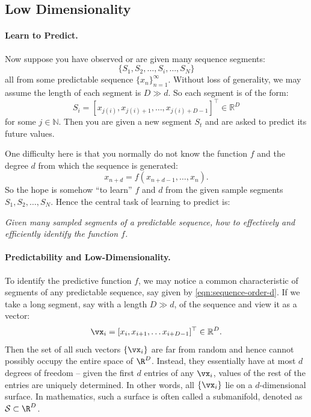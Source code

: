 \documentclass[../../book-main.tex]{subfiles}
\begin{document}
\subsection{Low Dimensionality}\label{sec:intro-low-dimensionality}
\paragraph{Learn to Predict.}
Now suppose you have observed or are given many sequence segments:
\begin{equation}
    \{S_1, S_2, \ldots, S_i, \ldots, S_N\}
\end{equation}
all from some predictable sequence $\{x_n\}_{n=1}^\infty$. Without loss of generality, we may assume the length of each segment is $D \gg d$. So each segment is of the form:
\begin{equation}
    S_i = [x_{j(i)}, x_{j(i)+1}, \ldots, x_{j(i)+D-1}]^\top \in \mathbb{R}^D
\end{equation}
for some $j \in \mathbb{N}$. Then you are given a new segment $S_t$ and are asked to predict its future values. 

One difficulty here is that you normally do not know the function $f$ and the degree $d$ from which the sequence is generated: 
\begin{equation}
    x_{n+d} = f(x_{n+d-1}, \ldots,  x_{n}).
\label{eqn:sequence-order-d}
\end{equation}
So the hope is somehow ``to learn'' $f$ and $d$ from the given sample segments $S_1, S_2, \ldots, S_N$. Hence the central task of learning to predict is:
\begin{center}
{\em Given many sampled segments of a predictable sequence, how to effectively and efficiently identify the function $f$.}
\end{center}

\paragraph{Predictability and Low-Dimensionality.}
To identify the predictive function $f$, we may notice a common characteristic of segments of any predictable sequence, say given by \eqref{eqn:sequence-order-d}. If we take a long segment, say with a length $D \gg d$, of the sequence and view it as a vector: 
\begin{equation}
    \vx_i = [x_i, x_{i+1}, \ldots x_{i+D-1}]^\top \in \mathbb{R}^D.
\end{equation}
Then the set of all such vectors $\{\vx_i\}$ are far from random and hence cannot possibly occupy the entire space of $\R^D$. Instead, they essentially have at most $d$ degrees of freedom -- given the first $d$ entries of any $\vx_i$, values of the rest of the entries are uniquely determined. In other words, all $\{\vx_i\}$ lie on a $d$-dimensional surface. In mathematics, such a surface is often called a submanifold, denoted as $\mathcal{S} \subset \R^D$.
\end{document}
